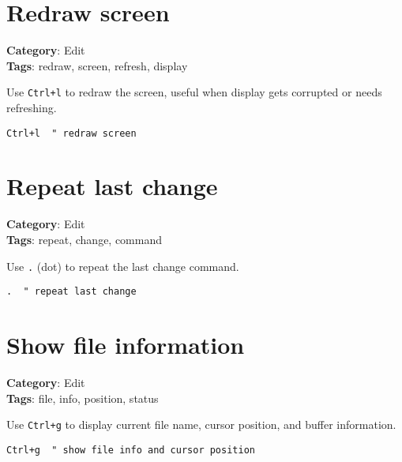 {{{\section{Redraw screen}

\textbf{Category}: Edit\\ \textbf{Tags}: redraw, screen, refresh, display
\vspace{0.5cm}

Use {\footnotesize \Verb§Ctrl+l§} to redraw the screen, useful when display gets corrupted or needs refreshing.

\begin{Exa*}{}
\begin{Verbatim}[fontsize=\footnotesize, breaklines, breakanywhere]
Ctrl+l  " redraw screen
\end{Verbatim}
\end{Exa*}

\section{Repeat last change}

\textbf{Category}: Edit\\ \textbf{Tags}: repeat, change, command
\vspace{0.5cm}

Use {\footnotesize \Verb§.§} (dot) to repeat the last change command.

\begin{Exa*}{}
\begin{Verbatim}[fontsize=\footnotesize, breaklines, breakanywhere]
.  " repeat last change
\end{Verbatim}
\end{Exa*}

\section{Show file information}

\textbf{Category}: Edit\\ \textbf{Tags}: file, info, position, status
\vspace{0.5cm}

Use {\footnotesize \Verb§Ctrl+g§} to display current file name, cursor position, and buffer information.

\begin{Exa*}{}
\begin{Verbatim}[fontsize=\footnotesize, breaklines, breakanywhere]
Ctrl+g  " show file info and cursor position
\end{Verbatim}
\end{Exa*}

}}}
